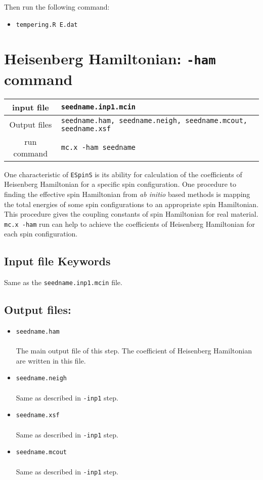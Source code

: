 \documentclass[10pt]{report}
\begin{document}
Then run the following command:

\begin{itemize}
\item {\tt tempering.R  E.dat}
\end{itemize}

 

\chapter{Heisenberg Hamiltonian: {\tt -ham} command}
\begin{center}
\begin{tabular}{|c|p{10cm}|}
\toprule
\hline
input file   & {\tt seedname.inp1.mcin}\\
\hline
Output files & {\tt seedname.ham, seedname.neigh, seedname.mcout, seedname.xsf}\\
\hline
run command  & {\tt mc.x -ham seedname}\\
\hline
\bottomrule
\end{tabular}
\end{center}
One characteristic of {\tt ESpinS} is its ability for calculation of the coefficients of Heisenberg Hamiltonian
for a specific spin configuration. One procedure to finding the effective spin Hamiltonian from {\it ab initio} based methods 
is mapping the total energies of some spin configurations to
an appropriate spin Hamiltonian. This procedure gives the coupling constants of spin Hamiltonian for real
material. {\tt mc.x -ham} run can help to achieve the coefficients of Heisenberg Hamiltonian for each spin configuration.
\section{Input file Keywords}
Same as the {\tt seedname.inp1.mcin} file.
\section{Output files:}
\begin{itemize}
\item {\tt seedname.ham}\\\\
The main output file of this step. The coefficient of Heisenberg Hamiltonian are written in this file.
\item {\tt seedname.neigh}\\\\
Same as described in {\tt -inp1} step.
\item {\tt seedname.xsf}\\\\
Same as described in {\tt -inp1} step.
\item {\tt seedname.mcout}\\\\
Same as described in {\tt -inp1} step.
\end{itemize}





\end{document}
